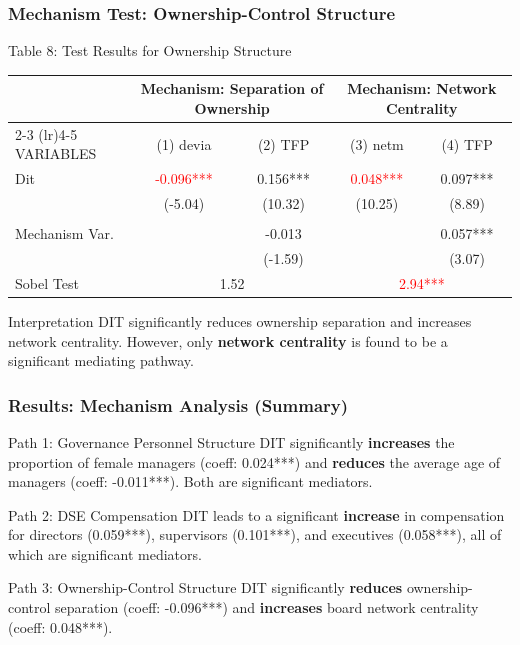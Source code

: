 \documentclass[aspectratio=169]{beamer}
\begin{document}
\begin{frame}[fragile]
    \frametitle{Mechanism Test: Ownership-Control Structure}
    \begin{block}{Table 8: Test Results for Ownership Structure}
    \centering
    \tiny
    \begin{tabular}{l c c c c}
    \toprule
    & \multicolumn{2}{c}{Mechanism: Separation of Ownership} & \multicolumn{2}{c}{Mechanism: Network Centrality} \\
    \cmidrule(lr){2-3} \cmidrule(lr){4-5}
    VARIABLES & (1) devia & (2) TFP & (3) netm & (4) TFP \\
    \midrule
    Dit & \textcolor{red}{-0.096***} & 0.156*** & \textcolor{red}{0.048***} & 0.097*** \\
        & (-5.04) & (10.32) & (10.25) & (8.89) \\
    \\
    Mechanism Var. & & -0.013 & & 0.057*** \\
                   & & (-1.59) & & (3.07) \\
    \midrule
    Sobel Test       & \multicolumn{2}{c}{1.52} & \multicolumn{2}{c}{\textcolor{red}{2.94***}} \\
    \bottomrule
    \end{tabular}
    \end{block}
    \vfill
    \begin{alertblock}{Interpretation}
       DIT significantly reduces ownership separation and increases network centrality. However, only \textbf{network centrality} is found to be a significant mediating pathway.
    \end{alertblock}
\end{frame}

\begin{frame}
  \frametitle{Results: Mechanism Analysis (Summary)}
    \begin{block}{Path 1: Governance Personnel Structure}
        DIT significantly \textbf{increases} the proportion of female managers (coeff: 0.024***) and \textbf{reduces} the average age of managers (coeff: -0.011***). Both are significant mediators.
    \end{block}
    \begin{block}{Path 2: DSE Compensation}
        DIT leads to a significant \textbf{increase} in compensation for directors (0.059***), supervisors (0.101***), and executives (0.058***), all of which are significant mediators.
    \end{block}
    \begin{block}{Path 3: Ownership-Control Structure}
        DIT significantly \textbf{reduces} ownership-control separation (coeff: -0.096***) and \textbf{increases} board network centrality (coeff: 0.048***).
    \end{block}
\end{frame}
\end{document}
